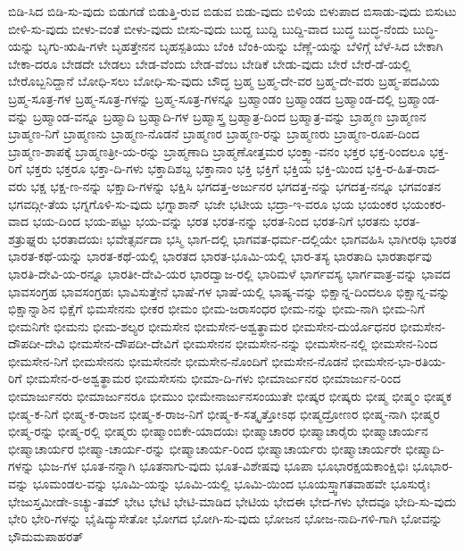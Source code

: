 ಬಿಡಿ-ಸಿದ
ಬಿಡಿ-ಸು-ವುದು
ಬಿಡುಗಡೆ
ಬಿಡುತ್ತಿ-ರುವ
ಬಿಡುವ
ಬಿಡು-ವುದು
ಬಿಳಿಯ
ಬಿಳುಪಾದ
ಬಿಸಾಡು-ವುದು
ಬಿಸುಟು
ಬೀಳಿ-ಸು-ವುದು
ಬೀಳು-ವಂತೆ
ಬೀಳು-ವುದು
ಬೀಸು-ವುದು
ಬುದ್ದ
ಬುದ್ದಿ
ಬುದ್ದಿ-ವಾದ
ಬುದ್ಧ
ಬುದ್ಧ-ನೆಂದು
ಬುದ್ಧಿ-ಯನ್ನು
ಬೃಗು-ಋಷಿ-ಗಳೇ
ಬೃಹತ್ತೇನನ
ಬೃಹಸ್ಪತಿಯು
ಬೆಂಕಿ
ಬೆಂಕಿ-ಯನ್ನು
ಬೆಣ್ಣೆ-ಯನ್ನು
ಬೆಳಿಗ್ಗೆ
ಬೆಳೆ-ಸಿದ
ಬೇಕಾಗಿ
ಬೇಕಾ-ದರೂ
ಬೇಡದೇ
ಬೇಡಲು
ಬೇಡ-ವೆಂದು
ಬೇಡ-ವೆಂಬ
ಬೇಡಿಕೆ
ಬೇಡು-ವುದು
ಬೇರೆ
ಬೇರೆ-ಡೆ-ಯಲ್ಲಿ
ಬೇರೊಬ್ಬನಿದ್ದಾನೆ
ಬೋಧಿ-ಸಲು
ಬೋಧಿ-ಸು-ವುದು
ಬೌದ್ಧ
ಬ್ರಹ್ಮ
ಬ್ರಹ್ಮ-ದೇ-ವರ
ಬ್ರಹ್ಮ-ದೇ-ವರು
ಬ್ರಹ್ಮ-ಪದವಿಯ
ಬ್ರಹ್ಮ-ಸೂತ್ರ-ಗಳ
ಬ್ರಹ್ಮ-ಸೂತ್ರ-ಗಳನ್ನು
ಬ್ರಹ್ಮ-ಸೂತ್ರ-ಗಳನ್ನೂ
ಬ್ರಹ್ಮಾಂಡಂ
ಬ್ರಹ್ಮಾಂಡದ
ಬ್ರಹ್ಮಾಂಡ-ದಲ್ಲಿ
ಬ್ರಹ್ಮಾಂಡ-ವನ್ನು
ಬ್ರಹ್ಮಾಂಡ-ವನ್ನೂ
ಬ್ರಹ್ಮಾದಿ
ಬ್ರಹ್ಮಾದಿ-ಗಳ
ಬ್ರಹ್ಮಾಸ್ತ್ರ
ಬ್ರಹ್ಮಾತ್ರ-ದಿಂದ
ಬ್ರಹ್ಮಾತ್ರ-ವನ್ನು
ಬ್ರಾಹ್ಮಣ
ಬ್ರಾಹ್ಮಣನ
ಬ್ರಾಹ್ಮಣ-ನಿಗೆ
ಬ್ರಾಹ್ಮಣನು
ಬ್ರಾಹ್ಮಣ-ನೊಡನೆ
ಬ್ರಾಹ್ಮಣರ
ಬ್ರಾಹ್ಮಣ-ರನ್ನು
ಬ್ರಾಹ್ಮಣರು
ಬ್ರಾಹ್ಮಣ-ರೂಪ-ದಿಂದ
ಬ್ರಾಹ್ಮಣ-ಶಾಪಕ್ಕೆ
ಬ್ರಾಹ್ಮಣತ್ರೀ-ಯ-ರನ್ನು
ಬ್ರಾಹ್ಮಣಾದಿ
ಬ್ರಾಹ್ಮಣೋತ್ತಮರ
ಭಂಕ್ತ್ವಾ-ವನಂ
ಭಕ್ತರ
ಭಕ್ತ-ರಿಂದಲೂ
ಭಕ್ತ-ರಿಗೆ
ಭಕ್ತರು
ಭಕ್ತರೂ
ಭಕ್ತಾ-ದಿ-ಗಳು
ಭಕ್ತಾದಿಶಬ್ದ
ಭಕ್ತಾನಾಂ
ಭಕ್ತಿ
ಭಕ್ತಿಗೆ
ಭಕ್ತಿಯ
ಭಕ್ತಿ-ಯಿಂದ
ಭಕ್ತಿ-ರ-ಹಿತ-ರಾದ-ವರು
ಭಕ್ಷ
ಭಕ್ಷ-ಣ-ನನ್ನು
ಭಕ್ಷಾದಿ-ಗಳನ್ನು
ಭಕ್ಷಿಸಿ
ಭಗದತ್ತ-ಅರ್ಜುನರ
ಭಗದತ್ತ-ನನ್ನು
ಭಗದತ್ತ-ನನ್ನೂ
ಭಗವಂತನ
ಭಗವದ್ಗೀ-ತೆಯ
ಭಗ್ನಗೊಳಿ-ಸು-ವುದು
ಭಗ್ನಾಶಾನ್
ಭಜೇ
ಭಟೀಯ
ಭದ್ರಾ-ಇ-ವರೂ
ಭಯ
ಭಯಂಕರ
ಭಯಂಕರ-ವಾದ
ಭಯ-ದಿಂದ
ಭಯ-ಪಟ್ಟು
ಭಯ-ವನ್ನು
ಭರತ
ಭರತ-ನನ್ನು
ಭರತ-ನಿಂದ
ಭರತ-ನಿಗೆ
ಭರತನು
ಭರತ-ಶತ್ರುಘ್ನರು
ಭರತಾದಯಃ
ಭವೇತ್ಸರ್ವದಾ
ಭಸ್ಮಿ
ಭಾಗ-ದಲ್ಲಿ
ಭಾಗವತ-ಧರ್ಮ-ದಲ್ಲಿಯೇ
ಭಾಗವಹಿಸಿ
ಭಾಗೀರಥಿ
ಭಾರತ
ಭಾರತ-ಕಥೆ-ಯನ್ನು
ಭಾರತ-ಕಥೆ-ಯಲ್ಲಿ
ಭಾರತದ
ಭಾರತ-ಭೂಮಿ-ಯಲ್ಲಿ
ಭಾರ-ತಸ್ಯ
ಭಾರತಾದಿ
ಭಾರತಾರ್ಥವು
ಭಾರತಿ-ದೇವಿ-ಯ-ರನ್ನೂ
ಭಾರತೀ-ದೇವಿ-ಯರ
ಭಾರದ್ವಾಜ-ರಲ್ಲಿ
ಭಾರಿಮಳೆ
ಭಾರ್ಗವಸ್ಯ
ಭಾರ್ಗವಾತ್ರ-ವನ್ನು
ಭಾವದ
ಭಾವಸಂಗ್ರಹ
ಭಾವಸಂಗ್ರಹಃ
ಭಾವಿಸುತ್ತೇನೆ
ಭಾಷೆ-ಗಳ
ಭಾಷೆ-ಯಲ್ಲಿ
ಭಾಷ್ಯ-ವನ್ನು
ಭಿಕ್ಷಾನ್ನ-ದಿಂದಲೂ
ಭಿಕ್ಷಾನ್ನ-ವನ್ನು
ಭಿಕ್ಷಾನ್ನಾಶಿನ
ಭಿಕ್ಷೆಗೆ
ಭಿಮಸೇನನು
ಭೀಕರ
ಭೀಮಂ
ಭೀಮ-ಜರಾಸಂಧರ
ಭೀಮ-ನನ್ನು
ಭೀಮ-ನಾಗಿ
ಭೀಮ-ನಿಗೆ
ಭೀಮನಿಗೇ
ಭೀಮನು
ಭೀಮ-ಶಲ್ಯರ
ಭೀಮಸೇನ
ಭೀಮಸೇನ-ಅಶ್ವತ್ಥಾಮರ
ಭೀಮಸೇನ-ದುರ್ಯೊಧನರ
ಭೀಮಸೇನ-ದೌಪದೀ-ದೇವಿ
ಭೀಮಸೇನ-ದೌಪದೀ-ದೇವಿಗೆ
ಭೀಮಸೇನನ
ಭೀಮಸೇನ-ನನ್ನು
ಭೀಮಸೇನ-ನಲ್ಲಿ
ಭೀಮಸೇನ-ನಿಂದ
ಭೀಮಸೇನ-ನಿಗೆ
ಭೀಮಸೇನನು
ಭೀಮಸೇನನೇ
ಭೀಮಸೇನ-ನೊಂದಿಗೆ
ಭೀಮಸೇನ-ನೊಡನೆ
ಭೀಮಸೇನ-ಭಾ-ರತಿಯ-ರಿಗೆ
ಭೀಮಸೇನ-ರ-ಅಶ್ವತ್ಥಾಮರ
ಭೀಮಸೇಸನು
ಭೀಮಾ-ದಿ-ಗಳು
ಭೀಮಾರ್ಜುನರ
ಭೀಮಾರ್ಜುನ-ರಿಂದ
ಭೀಮಾರ್ಜುನರು
ಭೀಮಾರ್ಜುನರೂ
ಭೀಮುಂ
ಭೀಮೇನಾರ್ಜುನಸಂಯುತೇ
ಭೀಷ್ಕರ
ಭೀಷ್ಕರು
ಭೀಷ್ಮ
ಭೀಷ್ಮಂ
ಭೀಷ್ಮಕ
ಭೀಷ್ಮ-ಕ-ನಿಗೆ
ಭೀಷ್ಮ-ಕ-ರಾಜನ
ಭೀಷ್ಮ-ಕ-ರಾಜ-ನಿಗೆ
ಭೀಷ್ಮ-ಕ-ಸತ್ಕೃತ್ತೋಽಥ
ಭೀಷ್ಮದ್ರೋಣರ
ಭೀಷ್ಮ-ನಾಗಿ
ಭೀಷ್ಮರ
ಭೀಷ್ಮ-ರನ್ನು
ಭೀಷ್ಮ-ರಲ್ಲಿ
ಭೀಷ್ಮರು
ಭೀಷ್ಮಾಂಬಿಕೇ-ಯಾದಯಃ
ಭೀಷ್ಮಾಚಾರರ
ಭೀಷ್ಮಾಚಾರೈರು
ಭೀಷ್ಮಾಚಾರ್ಯನ
ಭೀಷ್ಮಾಚಾರ್ಯರ
ಭೀಷ್ಮಾ-ಚಾರ್ಯ-ರನ್ನು
ಭೀಷ್ಮಾಚಾರ್ಯ-ರಿಂದ
ಭೀಷ್ಮಾಚಾರ್ಯರು
ಭೀಷ್ಮಾಚಾರ್ಯರೇ
ಭೀಷ್ಮಾದಿ-ಗಳನ್ನು
ಭುಜ-ಗಳ
ಭೂತ-ನನ್ನಾಗಿ
ಭೂತನಾಗು-ವುದು
ಭೂತ-ವಿಶೇಷವು
ಭೂಪಾ
ಭೂಭಾರಕ್ಷಯಕಾಂಕ್ಷಿಭಿಃ
ಭೂಭಾರ-ವನ್ನು
ಭೂಮಂಡಲ-ವನ್ನು
ಭೂಮಿ-ಯನ್ನು
ಭೂಮಿ-ಯಲ್ಲಿ
ಭೂಮಿ-ಯಿಂದ
ಭೂಯಸ್ತ್ವಾಗತವಾಹವೇ
ಭೂಸುರೈಃ
ಭೇಜುಸ್ತಮೀಡೇ-ಽಚ್ಯು-ತಮ್
ಭೇಟ
ಭೇಟಿ
ಭೇಟಿ-ಮಾಡಿದ
ಭೇಟಿಯ
ಭೇದಈ
ಭೇದ-ಗಳು
ಭೇದವೂ
ಭೇದಿ-ಸು-ವುದು
ಭೇರಿ
ಭೇರಿ-ಗಳನ್ನು
ಭೈಷಿದ್ಯುಸೇತೋ
ಭೋಗದ
ಭೋಗಿ-ಸು-ವುದು
ಭೋಜನ
ಭೋಜ-ನಾದಿ-ಗಳಿ-ಗಾಗಿ
ಭೋವನ್ನು
ಭೌಮಮಪಾಹರತ್
